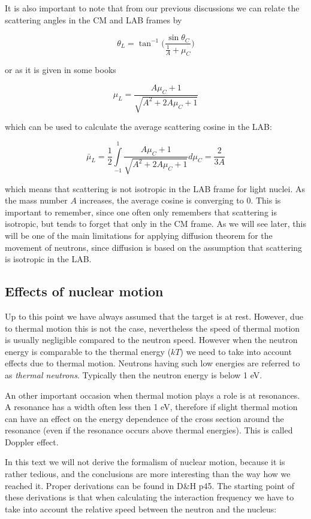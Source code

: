 It is also important to note that from our previous discussions we can relate the scattering angles in the CM and LAB frames by

$$\theta_L=\tan^{-1}\Big(\frac{\sin \theta_C}{\frac{1}{A}+\mu_C}\Big)$$

\noindent or as it is given in some books

$$\mu_L=\frac{A\mu_C+1}{\sqrt{A^2+2A\mu_C+1}}$$

\noindent which can be used to calculate the average scattering cosine in the LAB:

$$\bar{\mu}_L=\frac{1}{2}\int\limits_{-1}^{1}\frac{A\mu_C+1}{\sqrt{A^2+2A\mu_C+1}}d\mu_C=\frac{2}{3A}$$

\noindent which means that scattering is not isotropic in the LAB frame for light nuclei. As the mass number $A$ increases, the average cosine is converging to 0. This is important to remember, since one often only remembers that scattering is isotropic, but tends to forget that only in the CM frame. As we will see later, this will be one of the main limitations for applying diffusion theorem for the movement of neutrons, since diffusion is based on the assumption that scattering is isotropic in the LAB.


\subsection{Effects of nuclear motion}

Up to this point we have always assumed that the target is at rest. However, due to thermal motion this is not the case, nevertheless the speed of thermal motion is usually negligible compared to the neutron speed. However when the neutron energy is comparable to the thermal energy ($kT$) we need to take into account effects due to thermal motion. Neutrons having such low energies are referred to as \textit{thermal neutrons}. Typically then the neutron energy is below 1 eV.

An other important occasion when thermal motion plays a role is at resonances. A resonance has a width often less then 1 eV, therefore if slight thermal motion can have an effect on the energy dependence of the cross section around the resonance (even if the resonance occurs above thermal energies). This is called Doppler effect. 

In this text we will not derive the formalism of nuclear motion, because it is rather tedious, and the conclusions are more interesting than the way how we reached it. Proper derivations can be found in D\&H p45. The starting point of these derivations is that when calculating the interaction frequency we have to take into account the relative speed between the neutron and the nucleus:

